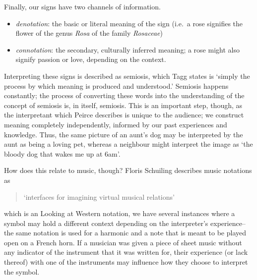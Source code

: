 Finally, our signs have two channels of information.
\begin{itemize}
    \item \emph{\gls{denotation}}: the basic or literal meaning of the sign (i.e.\ a rose signifies the flower of the genus \emph{Rosa} of the family \emph{Rosaceae})
    \item \emph{\gls{connotation}}: the secondary, culturally inferred meaning; a rose might also signify passion or love, depending on the context.
\end{itemize}

Interpreting these signs is described as semiosis, which Tagg states is `simply the process by which meaning is produced and understood.'\autocite[156]{taggMusicMeaningsModern2013}
Semiosis happens constantly; the process of converting these words into the understanding of the concept of semiosis is, in itself, semiosis. 
This is an important step, though, as the interpretant which Peirce describes is unique to the audience; 
we construct meaning completely independently, informed by our past experiences and knowledge.
Thus, the same picture of an aunt's dog may be interpreted by the aunt as being a loving pet, whereas a neighbour might interpret the image as `the bloody dog that wakes me up at 6am'.

How does this relate to music, though? 
Floris Schuiling describes music notations as \begin{quote}
    `interfaces for imagining virtual musical relations'
\end{quote}
which is an 
Looking at Western notation, we have several instances where a symbol may hold a different context depending on the interpreter's experience-- 
the same notation is used for a harmonic and a note that is meant to be played open on a French horn. 
If a musician was given a piece of sheet music without any indicator of the instrument that it was written for, their experience (or lack thereof) with one of the instruments may influence how they choose to interpret the symbol.

